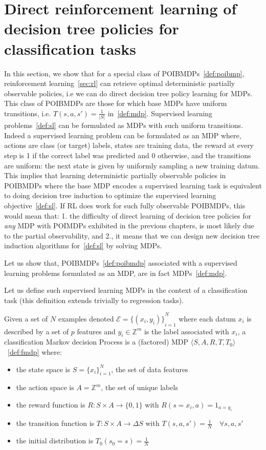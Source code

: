 \chapter{Direct reinforcement learning of decision tree policies for classification tasks}\label{sec:pomdp-classif}
In this section, we show that for a special class of POIBMDPs~\ref{def:poibmp}, reinforcement learning~\ref{sec:rl} can retrieve optimal deterministic partially observable policies, i.e we can do direct decision tree policy learning for MDPs.
This class of POIBMDPs are those for which base MDPs have uniform transitions, i.e. $T(s, a, s') = \frac{1}{|S|}$ in~\ref{def:mdp}.
Supervised learning problems~\ref{def:sl} can be formulated as MDPs with such uniform transitions.
Indeed a supervised learning problem can be formulated as an MDP where, actions are class (or target) labels, states are training data, the reward at every step is 1 if the correct label was predicted and 0 otherwise, and the transitions are uniform: the next state is given by uniformly sampling a new training datum. 
This implies that learning deterministic partially observable policies in POIBMDPs where the base MDP encodes a supervised learning task is equivalent to doing decision tree induction to optimize the supervised learning objective~\ref{def:sl}.
If RL does work for such fully observable POIBMDPs, this would mean that: 1. the difficulty of direct learning of decision tree policies for \textit{any} MDP with POIMDPs exhibited in the previous chapters, is most likely due to the partial observability, and 2., it means that we can design new decision tree induction algorithms for~\ref{def:sl} by solving MDPs.

Let us show that, POIBMDPs~\ref{def:poibmdp} associated with a supervised learning problems formulated as an MDP, are in fact MDPs~\ref{def:mdp}.

Let us define such supervised learning MDPs in the context of a classification task (this definition extends trivially to regression tasks).
\begin{definition}\label{def:cmdp}
    Given a set of $N$ examples denoted $\mathcal{E} = {\{(x_i, y_i)\}}_{i=1}^N$ where each datum $x_i$ is described by a set of $p$ features and $y_i \in \mathbb{Z}^m$ is the label associated with $x_i$, a classification Markov decision Process is a (factored) MDP $\langle S, A, R, T, T_0 \rangle$~\ref{def:fmdp} where:
    \begin{itemize}
        \item the state space is $S={\{x_i\}}_{i=1}^N$, the set of data features
        \item the action space is $A=\mathbb{Z}^m$, the set of unique labels
        \item the reward function is $R:S\times A \rightarrow \{0, 1\}$ with $R(s=x_i, a) = 1_{a=y_i}$
        \item the transition function is $T:S\times A \rightarrow \Delta S$ with $T(s, a, s') = \frac{1}{N} \quad \forall s, a, s'$
        \item the initial distribution is $T_0(s_0 = s) = \frac{1}{N}$
    \end{itemize}
\end{definition}


